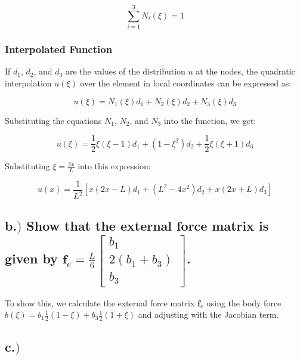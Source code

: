 \begin{equation*}
    \sum_{i=1}^{3} N_i(\xi) = 1
\end{equation*}

\subsubsection*{Interpolated Function}

If \( d_1 \), \( d_2 \), and \( d_3 \) are the values of the distribution \( u \) at the nodes, the quadratic interpolation \( u(\xi) \) over the element in local coordinates can be expressed as:

\begin{equation}
    u(\xi) = N_1(\xi) d_1 + N_2(\xi) d_2 + N_3(\xi) d_3
    \label{eq:displacement}
\end{equation}

Substituting the equations \( N_1 \), \( N_2 \), and \( N_3 \) into the function, we get:

\begin{equation}
    u(\xi) = \frac{1}{2} \xi (\xi - 1) d_1 + (1 - \xi^2) d_2 + \frac{1}{2} \xi (\xi + 1) d_3
\end{equation}

Substituting \( \xi = \frac{2x}{L} \) into this expression:

\begin{equation}
    u(x) = \frac{1}{L^2}\left[ x(2x - L) d_1 + \left( L^2 - 4x^2 \right) d_2 + x(2x + L) d_3 \right]
\end{equation}

\subsection*{b.$)$ Show that the external force matrix is given by \( \mathbf{f}_e = \frac{L}{6} \begin{bmatrix} b_1 \\ 2(b_1 + b_3) \\ b_3 \end{bmatrix} \).}

To show this, we calculate the external force matrix \( \mathbf{f}_e \) using the body force \( b(\xi) = b_1 \frac{1}{2}(1 - \xi) + b_3 \frac{1}{2}(1 + \xi) \) and adjusting with the Jacobian term.

\subsection*{c.$)$}

